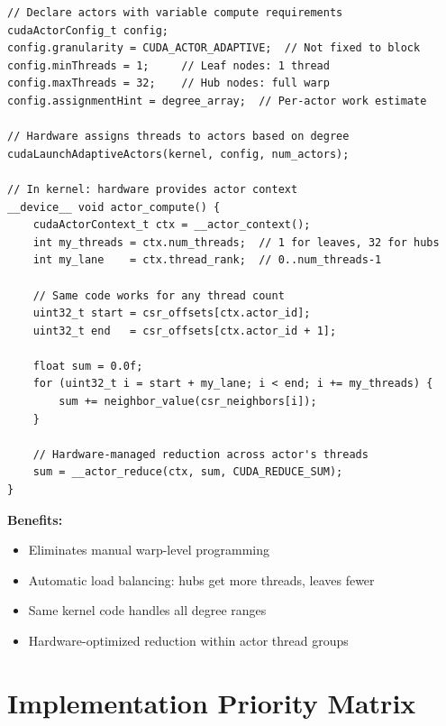 \documentclass[11pt,a4paper]{article}
\newenvironment{benefitsbox}{%
    \vspace{6pt}%
    \noindent\textbf{Benefits:}%
    \begin{itemize}[leftmargin=1.5em,topsep=2pt,itemsep=1pt]%
}{%
    \end{itemize}%
    \vspace{6pt}%
}
\begin{document}
\begin{lstlisting}[style=cstyle,title={Hardware sub-block actor assignment}]
// Declare actors with variable compute requirements
cudaActorConfig_t config;
config.granularity = CUDA_ACTOR_ADAPTIVE;  // Not fixed to block
config.minThreads = 1;     // Leaf nodes: 1 thread
config.maxThreads = 32;    // Hub nodes: full warp
config.assignmentHint = degree_array;  // Per-actor work estimate

// Hardware assigns threads to actors based on degree
cudaLaunchAdaptiveActors(kernel, config, num_actors);

// In kernel: hardware provides actor context
__device__ void actor_compute() {
    cudaActorContext_t ctx = __actor_context();
    int my_threads = ctx.num_threads;  // 1 for leaves, 32 for hubs
    int my_lane    = ctx.thread_rank;  // 0..num_threads-1

    // Same code works for any thread count
    uint32_t start = csr_offsets[ctx.actor_id];
    uint32_t end   = csr_offsets[ctx.actor_id + 1];

    float sum = 0.0f;
    for (uint32_t i = start + my_lane; i < end; i += my_threads) {
        sum += neighbor_value(csr_neighbors[i]);
    }

    // Hardware-managed reduction across actor's threads
    sum = __actor_reduce(ctx, sum, CUDA_REDUCE_SUM);
}
\end{lstlisting}

\begin{benefitsbox}
    \item Eliminates manual warp-level programming
    \item Automatic load balancing: hubs get more threads, leaves fewer
    \item Same kernel code handles all degree ranges
    \item Hardware-optimized reduction within actor thread groups
\end{benefitsbox}

\newpage

\section{Implementation Priority Matrix}
\end{document}
